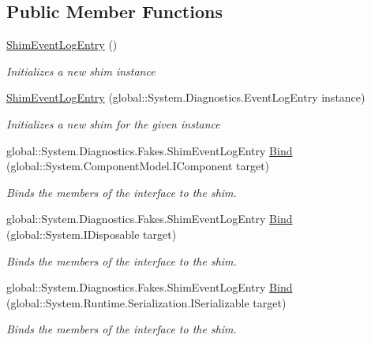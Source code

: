 \subsection*{Public Member Functions}
\begin{DoxyCompactItemize}
\item 
\hyperlink{class_system_1_1_diagnostics_1_1_fakes_1_1_shim_event_log_entry_abddc44d69f96b11f73fea754c5e2b381}{Shim\-Event\-Log\-Entry} ()
\begin{DoxyCompactList}\small\item\em Initializes a new shim instance\end{DoxyCompactList}\item 
\hyperlink{class_system_1_1_diagnostics_1_1_fakes_1_1_shim_event_log_entry_abadccd176a9bac2d57e1c59b4dfe4762}{Shim\-Event\-Log\-Entry} (global\-::\-System.\-Diagnostics.\-Event\-Log\-Entry instance)
\begin{DoxyCompactList}\small\item\em Initializes a new shim for the given instance\end{DoxyCompactList}\item 
global\-::\-System.\-Diagnostics.\-Fakes.\-Shim\-Event\-Log\-Entry \hyperlink{class_system_1_1_diagnostics_1_1_fakes_1_1_shim_event_log_entry_a83ac2e6c69cd40b68d9ec4240db64d5d}{Bind} (global\-::\-System.\-Component\-Model.\-I\-Component target)
\begin{DoxyCompactList}\small\item\em Binds the members of the interface to the shim.\end{DoxyCompactList}\item 
global\-::\-System.\-Diagnostics.\-Fakes.\-Shim\-Event\-Log\-Entry \hyperlink{class_system_1_1_diagnostics_1_1_fakes_1_1_shim_event_log_entry_afb4e04820263ccfc8c0694d887f9f3aa}{Bind} (global\-::\-System.\-I\-Disposable target)
\begin{DoxyCompactList}\small\item\em Binds the members of the interface to the shim.\end{DoxyCompactList}\item 
global\-::\-System.\-Diagnostics.\-Fakes.\-Shim\-Event\-Log\-Entry \hyperlink{class_system_1_1_diagnostics_1_1_fakes_1_1_shim_event_log_entry_a7f659b1740c13d2823d4e094e225b4ef}{Bind} (global\-::\-System.\-Runtime.\-Serialization.\-I\-Serializable target)
\begin{DoxyCompactList}\small\item\em Binds the members of the interface to the shim.\end{DoxyCompactList}\end{DoxyCompactItemize}
